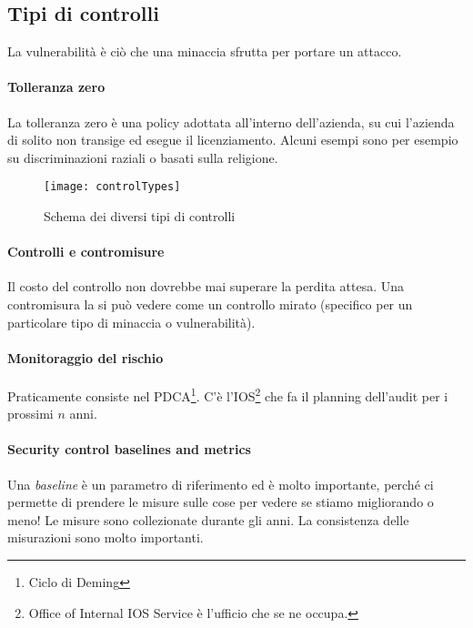\subsection{Tipi di controlli}

La vulnerabilità è ciò che una minaccia sfrutta per portare un attacco.

\paragraph*{Tolleranza zero}
La tolleranza zero è una policy adottata all'interno dell'azienda, su cui
l'azienda di solito non transige ed esegue il licenziamento. Alcuni esempi sono
per esempio su discriminazioni raziali o basati sulla religione.

\begin{figure}[H]
 \centering
 \texttt{[image: controlTypes]}
 \caption{Schema dei diversi tipi di controlli}
\end{figure}



\paragraph*{Controlli e contromisure}

Il costo del controllo non dovrebbe mai superare la perdita attesa.
Una contromisura la si può vedere come un controllo mirato (specifico per un
particolare tipo di minaccia o vulnerabilità).

\paragraph*{Monitoraggio del rischio}

Praticamente consiste nel PDCA\footnote{Ciclo di Deming}.
C'è l'IOS\footnote{Office of Internal IOS Service è l'ufficio che se ne occupa.}
che fa il planning dell'audit per i prossimi $n$ anni.


\paragraph*{Security control baselines and metrics}

Una \textit{baseline} è un parametro di riferimento ed è molto importante,
perché ci permette di prendere le misure sulle cose per vedere se stiamo
migliorando o meno!
Le misure sono collezionate durante gli anni. La consistenza delle misurazioni
sono molto importanti.

